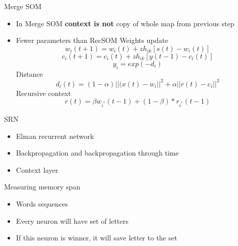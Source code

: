 \documentclass[10pt]{beamer}
\begin{document}
\begin{frame}[fragile]{Merge SOM}

\begin{itemize}
\item In Merge SOM \textbf{context is not} copy of whole map from previous step
\item Fewer parameters than RecSOM
Weights update
\begin{equation*}
w_i(t+1) = w_i(t) + zh_{ik}[s(t) - w_i(t)]
\end{equation*}
\begin{equation*}
c_i(t+1) = c_i(t) + zh_{ik}[y(t - 1) - c_i(t)]
\end{equation*}
\begin{equation*}
y_i=exp(-d_i)
\end{equation*}
Distance
\begin{equation*}
d_i(t) = (1-\alpha)||(x(t) - w_i||^2 + \alpha||r(t)-c_i||^2
\end{equation*}
Recursive context
\begin{equation*}
r(t)=\beta w_{i^*}(t-1)+(1-\beta)*r_{i^*}(t-1)
\end{equation*}
\end{itemize}




\end{frame}

\begin{frame}[fragile]{SRN}

\begin{itemize}
\item Elman recurrent network
\item Backpropagation and backpropagation through time
\item Context layer

\end{itemize}

\end{frame}

\begin{frame}[fragile]{Measuring memory span}

\begin{itemize}
\item Words sequences
\item Every neuron will have set of letters
\item If this neuron is winner, it will save letter to the set

\end{itemize}

\end{frame}
\end{document}

